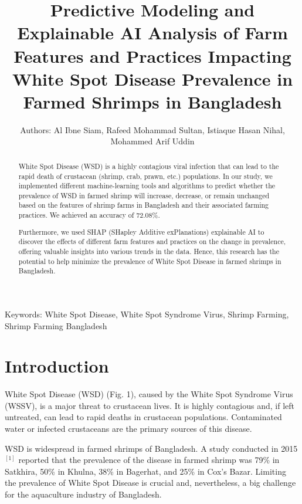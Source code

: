 \documentclass[journal,comsoc]{IEEEtran}
\begin{document}
\title{\Large
Predictive Modeling and Explainable AI Analysis of Farm Features and Practices 
Impacting White Spot Disease Prevalence in Farmed Shrimps in Bangladesh}
\author{
Authors:
Al Ibne Siam, 
Rafeed Mohammad Sultan, 
Istiaque Hasan Nihal, 
Mohammed Arif Uddin 
}
\maketitle

\begin{abstract}
White Spot Disease (WSD) is a highly contagious viral infection that can lead to the rapid death of crustacean (shrimp, crab, prawn, etc.) populations. In our study, we implemented different machine-learning tools and algorithms to predict whether the prevalence of WSD in farmed shrimp will increase, decrease, or remain unchanged based on the features of shrimp farms in Bangladesh and their associated farming practices. We achieved an accuracy of 72.08\%.

Furthermore, we used SHAP (SHapley Additive exPlanations) explainable AI to discover the effects of different farm features and practices on the change in prevalence, offering valuable insights into various trends in the data. Hence, this research has the potential to help minimize the prevalence of White Spot Disease in farmed shrimps in Bangladesh.
\end{abstract}


\begin{IEEEkeywords}
Keywords: White Spot Disease, White Spot Syndrome Virus, Shrimp Farming, Shrimp Farming Bangladesh
\end{IEEEkeywords}

\section{Introduction}
White Spot Disease (WSD) (Fig. 1), caused by the White Spot Syndrome Virus (WSSV), is a major threat to crustacean lives. It is highly contagious and, if left untreated, can lead to rapid deaths in crustacean populations. Contaminated water or infected crustaceans are the primary sources of this disease.  

WSD is widespread in farmed shrimps of Bangladesh. A study conducted in 2015 $^{[1]}$ reported that the prevalence of the disease in farmed shrimp was 79\% in Satkhira, 50\% in Khulna, 38\% in Bagerhat, and 25\% in Cox's Bazar. Limiting the prevalence of White Spot Disease is crucial and, nevertheless, a big challenge for the aquaculture industry of Bangladesh.
\end{document}
